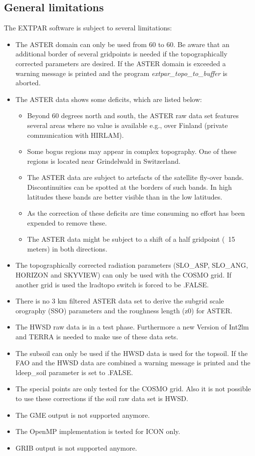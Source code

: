 \documentclass[a4paper,10pt,DIV14,BCOR1cm,titlepage,twoside]{scrartcl}
\begin{document}
\subsection{General limitations}
The EXTPAR software is subject to several limitations:
\begin{itemize}
 \item The ASTER domain can only be used from 60 to 60. Be aware that an additional border of several gridpoints is needed if the topographically corrected parameters are desired. If the ASTER domain is exceeded a warning message is printed and the program \textit{extpar\_topo\_to\_buffer} is aborted.
\item The ASTER data shows some deficits, which are listed below:
  \begin{itemize}
    \item Beyond 60 degrees north and south, the ASTER raw data set features several areas where no value is available e.g., over Finland (private communication with HIRLAM).
    \item Some bogus regions may appear in complex topography. One of these regions is located near Grindelwald in Switzerland.
    \item The ASTER data are subject to artefacts of the satellite fly-over bands. Discontinuities can be spotted at the borders of such bands. In high latitudes these bands are better visible than in the low latitudes.
    \item As the correction of these deficits are time consuming no effort has been expended to remove these.
    \item The ASTER data might be subject to a shift of a half gridpoint (~15 meters) in both directions.
  \end{itemize}
 \item The topographically corrected radiation parameters (SLO\_ASP, SLO\_ANG, HORIZON and SKYVIEW) can only be used with the COSMO grid. If another grid is used the lradtopo switch is forced to be .FALSE.
 \item There is no 3 km filtered ASTER data set to derive the subgrid scale orography (SSO) parameters and the roughness length (z0) for ASTER. 
\item The HWSD raw data is in a test phase. Furthermore a new Version of Int2lm and TERRA is needed to make use of these data sets.
\item The subsoil can only be used if the HWSD data is used for the topsoil. If the FAO and the HWSD data are combined a warning message is printed and the ldeep\_soil parameter is set to .FALSE.
\item The special points are only tested for the COSMO grid. Also it is not possible to use these corrections if the soil raw data set is HWSD.
\item The GME output is not supported anymore.
\item The OpenMP implementation is tested for ICON only.
\item GRIB output is not supported anymore.  
\end{itemize}
\end{document}
